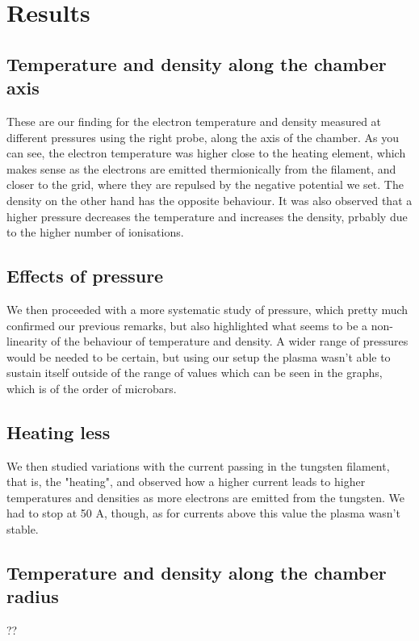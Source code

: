 \section{Results}
\subsection{Temperature and density along the chamber axis}
These are our finding for the electron temperature and density measured at different pressures using the right probe, along the axis of the chamber.
As you can see, the electron temperature was higher close to the heating element, which makes sense as the electrons are emitted thermionically from the filament, and closer to the grid, where they are repulsed by the negative potential we set.
The density on the other hand has the opposite behaviour.
It was also observed that a higher pressure decreases the temperature and increases the density, prbably due to the higher number of ionisations.

\subsection{Effects of pressure}
We then proceeded with a more systematic study of pressure, which pretty much confirmed our previous remarks, but also highlighted what seems to be a non-linearity of the behaviour of temperature and density.
A wider range of pressures would be needed to be certain, but using our setup the plasma wasn't able to sustain itself outside of the range of values which can be seen in the graphs, which is of the order of microbars.

\subsection{Heating less}
We then studied variations with the current passing in the tungsten filament, that is, the "heating", and observed how a higher current leads to higher temperatures and densities as more electrons are emitted from the tungsten.
We had to stop at 50 A, though, as for currents above this value the plasma wasn't stable.

\subsection{Temperature and density along the chamber radius}
??

